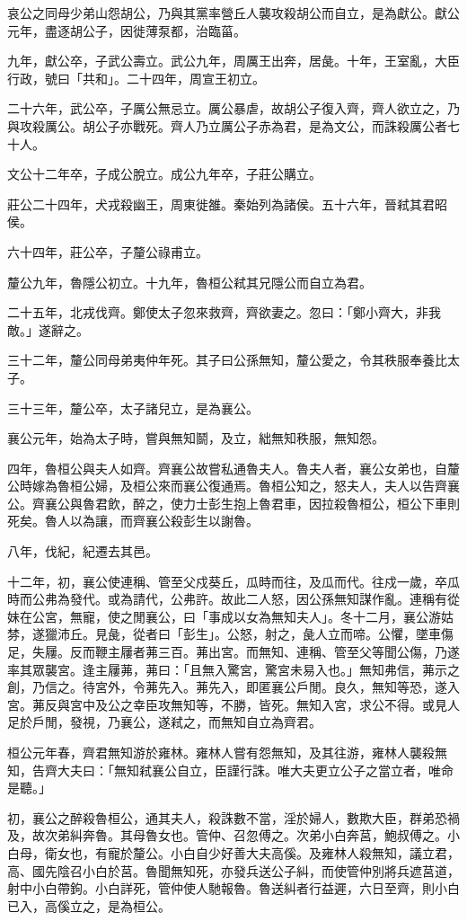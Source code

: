 \begin{pinyinscope}
哀公之同母少弟山怨胡公，乃與其黨率營丘人襲攻殺胡公而自立，是為獻公。獻公元年，盡逐胡公子，因徙薄泵都，治臨菑。

九年，獻公卒，子武公壽立。武公九年，周厲王出奔，居彘。十年，王室亂，大臣行政，號曰「共和」。二十四年，周宣王初立。

二十六年，武公卒，子厲公無忌立。厲公暴虐，故胡公子復入齊，齊人欲立之，乃與攻殺厲公。胡公子亦戰死。齊人乃立厲公子赤為君，是為文公，而誅殺厲公者七十人。

文公十二年卒，子成公脫立。成公九年卒，子莊公購立。

莊公二十四年，犬戎殺幽王，周東徙雒。秦始列為諸侯。五十六年，晉弒其君昭侯。

六十四年，莊公卒，子釐公祿甫立。

釐公九年，魯隱公初立。十九年，魯桓公弒其兄隱公而自立為君。

二十五年，北戎伐齊。鄭使太子忽來救齊，齊欲妻之。忽曰：「鄭小齊大，非我敵。」遂辭之。

三十二年，釐公同母弟夷仲年死。其子曰公孫無知，釐公愛之，令其秩服奉養比太子。

三十三年，釐公卒，太子諸兒立，是為襄公。

襄公元年，始為太子時，嘗與無知鬬，及立，絀無知秩服，無知怨。

四年，魯桓公與夫人如齊。齊襄公故嘗私通魯夫人。魯夫人者，襄公女弟也，自釐公時嫁為魯桓公婦，及桓公來而襄公復通焉。魯桓公知之，怒夫人，夫人以告齊襄公。齊襄公與魯君飲，醉之，使力士彭生抱上魯君車，因拉殺魯桓公，桓公下車則死矣。魯人以為讓，而齊襄公殺彭生以謝魯。

八年，伐紀，紀遷去其邑。

十二年，初，襄公使連稱、管至父戍葵丘，瓜時而往，及瓜而代。往戍一歲，卒瓜時而公弗為發代。或為請代，公弗許。故此二人怒，因公孫無知謀作亂。連稱有從妹在公宮，無寵，使之閒襄公，曰「事成以女為無知夫人」。冬十二月，襄公游姑棼，遂獵沛丘。見彘，從者曰「彭生」。公怒，射之，彘人立而啼。公懼，墜車傷足，失屨。反而鞭主屨者茀三百。茀出宮。而無知、連稱、管至父等聞公傷，乃遂率其眾襲宮。逢主屨茀，茀曰：「且無入驚宮，驚宮未易入也。」無知弗信，茀示之創，乃信之。待宮外，令茀先入。茀先入，即匿襄公戶閒。良久，無知等恐，遂入宮。茀反與宮中及公之幸臣攻無知等，不勝，皆死。無知入宮，求公不得。或見人足於戶閒，發視，乃襄公，遂弒之，而無知自立為齊君。

桓公元年春，齊君無知游於雍林。雍林人嘗有怨無知，及其往游，雍林人襲殺無知，告齊大夫曰：「無知弒襄公自立，臣謹行誅。唯大夫更立公子之當立者，唯命是聽。」

初，襄公之醉殺魯桓公，通其夫人，殺誅數不當，淫於婦人，數欺大臣，群弟恐禍及，故次弟糾奔魯。其母魯女也。管仲、召忽傅之。次弟小白奔莒，鮑叔傅之。小白母，衛女也，有寵於釐公。小白自少好善大夫高傒。及雍林人殺無知，議立君，高、國先陰召小白於莒。魯聞無知死，亦發兵送公子糾，而使管仲別將兵遮莒道，射中小白帶鉤。小白詳死，管仲使人馳報魯。魯送糾者行益遲，六日至齊，則小白已入，高傒立之，是為桓公。


\end{pinyinscope}

